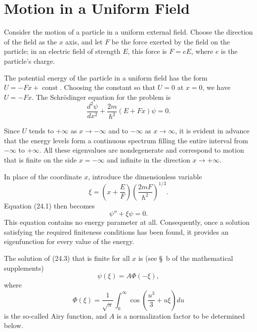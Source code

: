 \section{Motion in a Uniform Field}

Consider the motion of a particle in a uniform external field. Choose the
direction of the field as the $x$ axis, and let $F$ be the force exerted by
the field on the particle; in an electric field of strength $E$, this force
is $F=eE$, where $e$ is the particle's charge.

The potential energy of the particle in a uniform field has the form
$U=-Fx+\operatorname{const}$. Choosing the constant so that $U=0$ at $x=0$,
we have $U=-Fx$. The Schrödinger equation for the problem is
\begin{equation}
  \frac{d^2\psi}{dx^2}+\frac{2m}{\hbar^2}(E+Fx)\psi=0.
  \tag{24.1}
\end{equation}

Since $U$ tends to $+\infty$ as $x\to-\infty$ and to $-\infty$ as
$x\to\infty$, it is evident in advance that the energy levels form a
continuous spectrum filling the entire interval from $-\infty$ to $+\infty$.
All these eigenvalues are nondegenerate and
correspond to motion that is finite on the side $x=-\infty$ and infinite in
the direction $x\to+\infty$.

In place of the coordinate $x$, introduce the dimensionless variable
\begin{equation}
  \xi=\left(x+\frac{E}{F}\right)
  \left(\frac{2mF}{\hbar^2}\right)^{1/3}.
  \tag{24.2}
\end{equation}
Equation (24.1) then becomes
\begin{equation}
  \psi''+\xi\psi=0.
  \tag{24.3}
\end{equation}
This equation contains no energy parameter at all. Consequently, once a
solution satisfying the required finiteness conditions has been found, it
provides an eigenfunction for every value of the energy.

The solution of (24.3) that is finite for all $x$ is (see \S~b of the
mathematical supplements)
\begin{equation}
  \psi(\xi)=A\Phi(-\xi),
  \tag{24.4}
\end{equation}
where
\[
  \Phi(\xi)=\frac{1}{\sqrt{\pi}}\int_0^\infty
  \cos\left(\frac{u^3}{3}+u\xi\right)du
\]
is the so-called Airy function, and $A$ is a normalization factor to be
determined below.

